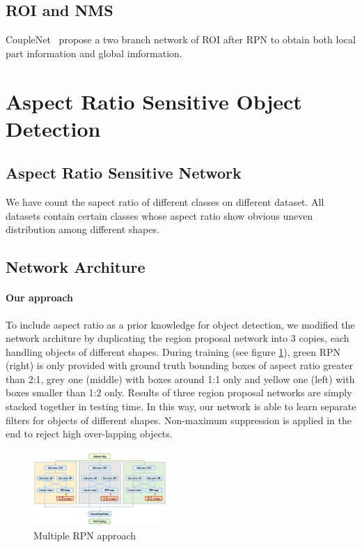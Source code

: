\documentclass[10pt,twocolumn,letterpaper]{article}
\begin{document}
\subsection{ROI and NMS}
CoupleNet~\cite{CoupleNet} propose a two branch network of ROI after RPN to obtain both local part information and global imformation.



\section{Aspect Ratio Sensitive Object Detection}
\subsection{Aspect Ratio Sensitive Network}
We have count the sapect ratio of different classes on different dataset. All datasets contain certain classes whose aspect ratio show obvious uneven distribution among different shapes. 


\subsection{Network Architure}
\paragraph{Our approach}
To include aspect ratio as a prior knowledge for object detection, we modified the network architure by duplicating the region proposal network into 3 copies, each handling objects of different shapes. During training (see figure \ref{ARS_De}), green RPN (right) is only provided with ground truth bounding boxes of aspect ratio greater than 2:1, grey one (middle) with boxes around 1:1 only and yellow one (left) with boxes smaller than 1:2 only. Results of three region proposal networks are simply stacked together in testing time. In this way, our network is able to learn separate filters for objects of different shapes. Non-maximum suppression is applied in the end to reject high over-lapping objects. 
    \begin{figure}[!htb]
    \includegraphics[width= 0.45\textwidth]{pic/ARS-archi-detail.png}
    \caption{Multiple RPN approach}
    \label{ARS_De}
    \end{figure}
\end{document}

